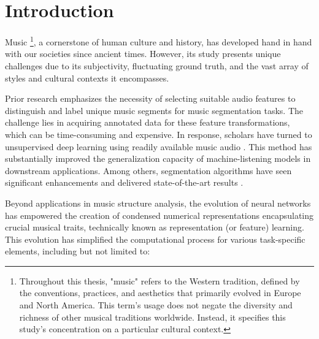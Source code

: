 \chapter{Introduction}

Music \footnote{Throughout this thesis, "music" refers to the Western tradition, defined by the conventions, practices, and aesthetics that primarily evolved in Europe and North America. This term's usage does not negate the diversity and richness of other musical traditions worldwide. Instead, it specifies this study's concentration on a particular cultural context.}, a cornerstone of human culture and history, has developed hand in hand with our societies since ancient times. However, its study presents unique challenges due to its subjectivity, fluctuating ground truth, and the vast array of styles and cultural contexts it encompasses.

Prior research emphasizes the necessity of selecting suitable audio features to distinguish and label unique music segments for music segmentation tasks. The challenge lies in acquiring annotated data for these feature transformations, which can be time-consuming and expensive. In response, scholars have turned to unsupervised deep learning using readily available music audio \cite{deepfeaturesegment, Grill2015MusicAnnotations}. This method has substantially improved the generalization capacity of machine-listening models in downstream applications. Among others, segmentation algorithms have seen significant enhancements and delivered state-of-the-art results \cite{Hernandez-Olivan2021MusicFeatures, Li2023MERT:Training}.

Beyond applications in music structure analysis, the evolution of neural networks has empowered the creation of condensed numerical representations encapsulating crucial musical traits, technically known as representation (or feature) learning. This evolution has simplified the computational process for various task-specific elements, including but not limited to:

